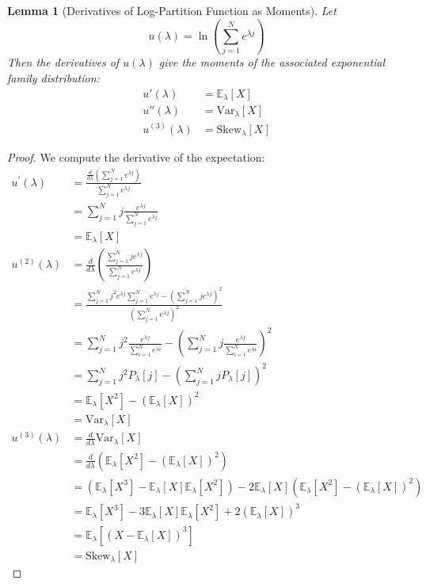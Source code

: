 \documentclass[a4paper, 10pt]{article}
\newtheorem{lemma}{Lemma}[section]
\theoremstyle{definition}
\begin{document}
\begin{lemma}[Derivatives of Log-Partition Function as Moments]\label{lem:log_partition_moments}
Let 
\[
u(\lambda) = \ln\left(\sum_{j=1}^{N} e^{\lambda j}\right)
\]
Then the derivatives of \( u(\lambda) \) give the moments of the associated exponential family distribution:
\begin{align}
u'(\lambda) &= \mathbb{E}_{\lambda}[X] \\
u''(\lambda) &= \text{Var}_{\lambda}[X] \\
u^{(3)}(\lambda) &=  \text{Skew}_{\lambda}[X]
\end{align}
\end{lemma}

\begin{proof}
We compute the derivative of the expectation:
\begin{align*}
\label{eq:var}
u^{'}(\lambda) &= \frac{\frac{d}{d\lambda}(\sum_{j=1}^{N} e^{\lambda j})}{\sum_{j=1}^{N} e^{\lambda j}}\\
&= \sum_{j=1}^{N} j \frac{e^{\lambda j}}{\sum_{j=1}^{N} e^{\lambda j}} \\
& = \mathbb{E}_{\lambda}[X] \\
u^{(2)}(\lambda) &= \frac{d}{d\lambda}\left(\frac{\sum_{j=1}^{N} j e^{\lambda j}}{\sum_{j=1}^{N} e^{\lambda j}}\right) \\ 
&= \frac{\sum_{j=1}^{N} j^2 e^{\lambda j} \sum_{j=1}^{N} e^{\lambda j} - \left(\sum_{j=1}^{N} j e^{\lambda j}\right)^2} {\left(\sum_{j=1}^{N} e^{\lambda j}\right)^2} \\
&= \sum_{j=1}^{N} j^2 \frac{e^{\lambda j}}{\sum_{i=1}^{N} e^{\lambda i}} - \left(\sum_{j=1}^{N} j\frac{e^{\lambda j}}{\sum_{i=1}^{N} e^{\lambda i}}\right)^2 \\ 
&= \sum_{j=1}^{N} j^2 P_{\lambda}[j] - \left(\sum_{j=1}^{N} j P_{\lambda}[j]\right)^2 \\
&= \mathbb{E}_{\lambda}[X^2] - \left(\mathbb{E}_{\lambda}[X]\right)^2 \\
&= \text{Var}_{\lambda}[X] \\ 
u^{(3)}(\lambda) &= \frac{d}{d\lambda} \text{Var}_{\lambda}[X] \\
&= \frac{d}{d\lambda} \left(\mathbb{E}_{\lambda}[X^2] - (\mathbb{E}_{\lambda}[X])^2\right) \\
&= \left(\mathbb{E}_{\lambda}[X^3] - \mathbb{E}_{\lambda}[X]\mathbb{E}_{\lambda}[X^2]\right) - 2\mathbb{E}_{\lambda}[X]\left(\mathbb{E}_{\lambda}[X^2] - (\mathbb{E}_{\lambda}[X])^2\right) \\
&= \mathbb{E}_{\lambda}[X^3] - 3\mathbb{E}_{\lambda}[X]\mathbb{E}_{\lambda}[X^2] + 2(\mathbb{E}_{\lambda}[X])^3 \\
&= \mathbb{E}_{\lambda}[(X - \mathbb{E}_{\lambda}[X])^3]\\
&=\text{Skew}_{\lambda}[X]
\end{align*}
\end{proof}
\end{document}
